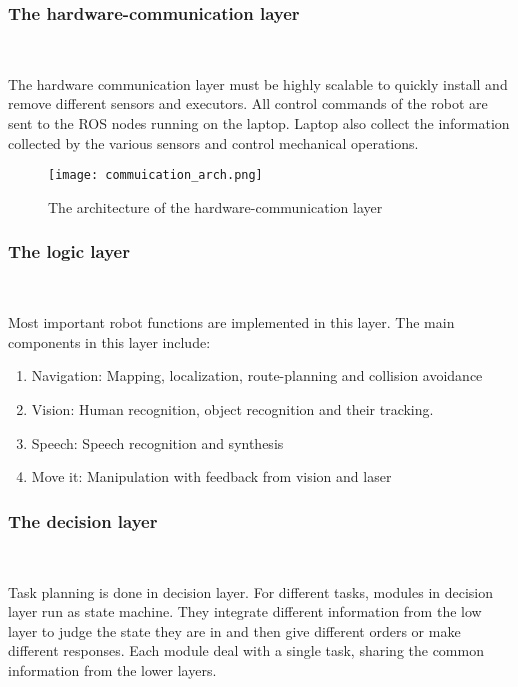 \subsubsection{The hardware-communication layer}
\ 

The hardware communication layer must be highly scalable to quickly install and remove different sensors and executors. All control commands of the robot are sent to the ROS nodes running on the laptop. Laptop also collect the information collected by the various sensors and control mechanical operations.
\begin{figure}[!t]
	\centering
    \texttt{[image: commuication\_arch.png]}
    \caption{The architecture of the hardware-communication layer}
    \label{arch_comm}
\end{figure}

\subsubsection{The logic layer}
\ 

Most important robot functions are implemented in this layer. The main components in this layer include:
\begin{enumerate}
    \item Navigation: Mapping, localization, route-planning and collision avoidance
    \item Vision: Human recognition, object recognition and their tracking.
    \item Speech: Speech recognition and synthesis
    \item Move it: Manipulation with feedback from vision and laser
\end{enumerate}

\subsubsection{The decision layer}
\ 

Task planning is done in decision layer. For different tasks, modules in decision layer run as state machine. They integrate different information from the low layer to judge the state they are in and then give different orders or make different responses. Each module deal with a single task, sharing the common information from the lower layers.

